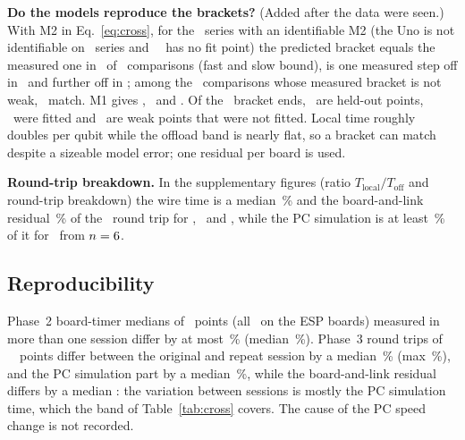 \textbf{Do the models reproduce the brackets?} (Added after the data were seen.) With M2 in Eq.~\eqref{eq:cross}, for the \PredSeriesOk\ series with an identifiable M2 (the Uno is not identifiable on \PredSeriesNI\ series and \espA\ \grover\ has no fit point) the predicted bracket equals the measured one in \PredMatchTwo\ of \PredN\ comparisons (fast and slow bound), is one measured step off in \PredOffOneTwo\ and further off in \PredOffMoreTwo; among the \PredNonWeak\ comparisons whose measured bracket is not weak, \PredNonWeakMatch\ match. M1 gives \PredMatchOne, \PredOffOneOne\ and \PredOffMoreOne. Of the \PredEnds\ bracket ends, \PredEndsHeld\ are held-out points, \PredEndsFit\ were fitted and \PredEndsWeak\ are weak points that were not fitted. Local time roughly doubles per qubit while the offload band is nearly flat, so a bracket can match despite a sizeable model error; one residual per board is used.

\textbf{Round-trip breakdown.} In the supplementary figures (ratio $T_{\mathrm{local}}/T_{\mathrm{off}}$ and round-trip breakdown) the wire time is a median \BreakWirePct\,\% and the board-and-link residual \BreakResPct\,\% of the \espB\ round trip for \hall, \bell\ and \qft, while the PC simulation is at least \BreakPcShare\,\% of it for \grover\ from $n=6$.

\subsection{Reproducibility}
Phase~2 board-timer medians of \ReproPtwoN\ points (all \grover\ on the ESP boards) measured in more than one session differ by at most \ReproPtwoMaxPct\,\% (median \ReproPtwoMedPct\,\%). Phase~3 round trips of \ReproPthreeN\ \espA\ points differ between the original and repeat session by a median \ReproPthreeE\,\% (max \ReproPthreeEMax\,\%), and the PC simulation part by a median \ReproPthreeSim\,\%, while the board-and-link residual differs by a median \ReproPthreeResid\us: the variation between sessions is mostly the PC simulation time, which the band of Table~\ref{tab:cross} covers. The cause of the PC speed change is not recorded.

